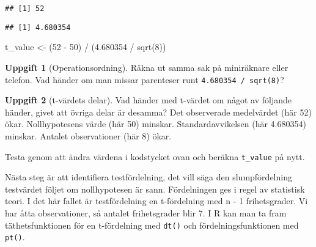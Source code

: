 \documentclass[
]{book}
\newenvironment{Shaded}{\begin{snugshade}}{\end{snugshade}}
\newcommand{\DecValTok}[1]{\textcolor[rgb]{0.00,0.00,0.81}{#1}}
\newcommand{\FloatTok}[1]{\textcolor[rgb]{0.00,0.00,0.81}{#1}}
\newcommand{\FunctionTok}[1]{\textcolor[rgb]{0.00,0.00,0.00}{#1}}
\newcommand{\NormalTok}[1]{#1}
\newcommand{\OtherTok}[1]{\textcolor[rgb]{0.56,0.35,0.01}{#1}}
\newcommand{\SpecialCharTok}[1]{\textcolor[rgb]{0.00,0.00,0.00}{#1}}
\theoremstyle{definition}
\theoremstyle{definition}
\theoremstyle{definition}
\newtheorem{exercise}{Uppgift}[chapter]
\theoremstyle{definition}
\theoremstyle{remark}
\begin{document}
\begin{verbatim}
## [1] 52
\end{verbatim}

\begin{Shaded}
\end{Shaded}

\begin{verbatim}
## [1] 4.680354
\end{verbatim}

\begin{Shaded}
\begin{Highlighting}[]
\NormalTok{t\_value }\OtherTok{\textless{}{-}}\NormalTok{ (}\DecValTok{52} \SpecialCharTok{{-}} \DecValTok{50}\NormalTok{) }\SpecialCharTok{/}\NormalTok{ (}\FloatTok{4.680354} \SpecialCharTok{/} \FunctionTok{sqrt}\NormalTok{(}\DecValTok{8}\NormalTok{))}
\end{Highlighting}
\end{Shaded}

\begin{exercise}[Operationsordning]
Räkna ut samma sak på miniräknare eller telefon. Vad händer om man missar parenteser runt \texttt{4.680354\ /\ sqrt(8)}?
\end{exercise}

\begin{exercise}[t-värdets delar]
Vad händer med t-värdet om något av följande händer, givet att övriga delar är desamma? Det observerade medelvärdet (här 52) ökar. Nollhypotesens värde (här 50) minskar. Standardavvikelsen (här 4.680354) minskar. Antalet observationer (här 8) ökar.

Testa genom att ändra värdena i kodstycket ovan och beräkna \texttt{t\_value} på nytt.
\end{exercise}

Nästa steg är att identifiera testfördelning, det vill säga den slumpfördelning testvärdet följet om nollhypotesen är sann. Fördelningen ges i regel av statistisk teori. I det här fallet är testfördelning en t-fördelning med n - 1 frihetsgrader. Vi har åtta observationer, så antalet frihetsgrader blir 7. I R kan man ta fram täthetsfunktionen för en t-fördelning med \texttt{dt()} och fördelningsfunktionen med \texttt{pt()}.
\end{document}
